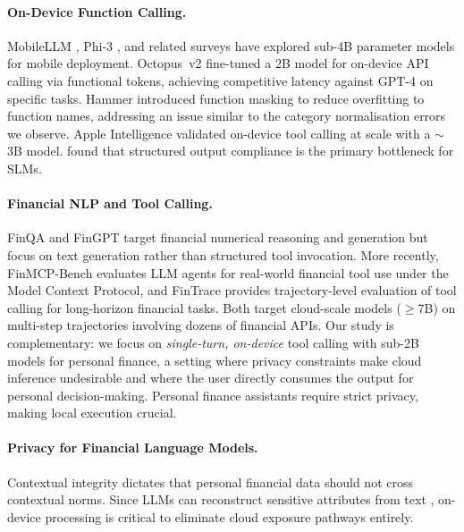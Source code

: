 \documentclass[11pt,twocolumn]{article}
\begin{document}
\paragraph{On-Device Function Calling.}
MobileLLM \citep{liu2024mobilellm}, Phi-3 \citep{abdin2024phi3}, and
related surveys \citep{xu2024ondevice} have explored sub-4B parameter
models for mobile deployment.
Octopus~v2 \citep{chen2024octopus} fine-tuned a 2B model for
on-device API calling via functional tokens, achieving competitive
latency against GPT-4 on specific tasks.
Hammer \citep{lin2024hammer} introduced function masking to reduce
overfitting to function names, addressing an issue similar to the
category normalisation errors we observe.
Apple Intelligence \citep{gunter2024apple} validated on-device tool
calling at scale with a $\sim$3B model.
\citet{kavathekar2025small} found that structured output compliance
is the primary bottleneck for SLMs.

\paragraph{Financial NLP and Tool Calling.}
FinQA \citep{chen2021finqa} and FinGPT \citep{yang2023fingpt} target
financial numerical reasoning and generation but focus on text
generation rather than structured tool invocation.
More recently, FinMCP-Bench \citep{finmcpbench2026} evaluates LLM
agents for real-world financial tool use under the Model Context
Protocol, and FinTrace \citep{fintrace2026} provides trajectory-level
evaluation of tool calling for long-horizon financial tasks.
Both target cloud-scale models ($\geq$7B) on multi-step
trajectories involving dozens of financial APIs.
Our study is complementary: we focus on \emph{single-turn,
on-device} tool calling with sub-2B models for personal
finance, a setting where privacy constraints make cloud
inference undesirable and where the user directly consumes
the output for personal decision-making.
Personal finance assistants \citep{li2024personal} require strict
privacy, making local execution crucial.

\paragraph{Privacy for Financial Language Models.}
Contextual integrity \citep{nissenbaum2004privacy} dictates that personal financial data should not cross contextual norms. Since LLMs can reconstruct sensitive attributes from text \citep{staab2024memorization}, on-device processing is critical to eliminate cloud exposure pathways entirely.
\end{document}
